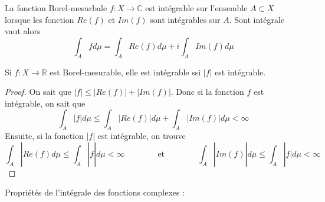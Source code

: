 \begin{definition}
    La fonction Borel-mesurbale $f:X\to\mathbb{C}$ est intégrable sur l'ensemble $A\subset X$ lorsque les fonction $Re(f)$ et $Im(f)$ sont intégrables sur $A$. Sont intégrale vaut alors
    \begin{equation*}
        \int_Afd\mu=\int_ARe(f)d\mu+i\int_AIm(f)d\mu
    \end{equation*}
\end{definition}

\begin{theo}
    Si $f:X\to\mathbb{R}$ est Borel-mesurable, elle est intégrable ssi $|f|$ est intégrable.
\end{theo}
\begin{proof}
    On sait que $|f|\leq |Re(f)|+|Im(f)|$. Donc si la fonction $f$ est intégrable, on sait que
    \begin{equation*}
        \int_A|f|d\mu \leq \int_A |Re(f)|d\mu + \int_A |Im(f)|d\mu<\infty
    \end{equation*}
    Ensuite, si la fonction $|f|$ est intégrable, on trouve
    \begin{equation*}
        \int_A |Re(f) d\mu \leq \int_A|f|d\mu<\infty \qquad\qquad \text{et} \qquad\qquad \int_A|Im(f)|d\mu\leq\int_A|f|d\mu<\infty
    \end{equation*}
\end{proof}

Propriétés de l'intégrale des fonctions complexes :

